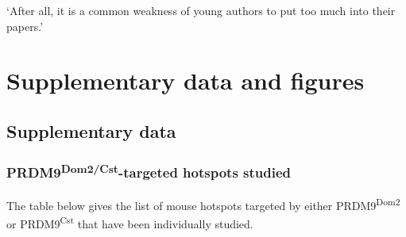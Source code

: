 \begin{savequote}[8cm]
‘After all, it is a common weakness of young authors to put too much into their papers.’

\end{savequote}

\chapter{\label{app:data-and-figs}Supplementary data and figures}

\minitoc{}

\section{Supplementary data}
\subsection{PRDM9\textsuperscript{Dom2/Cst}-targeted hotspots studied}

The table below gives the list of mouse hotspots targeted by either PRDM9\textsuperscript{Dom2} or PRDM9\textsuperscript{Cst} that have been individually studied.


